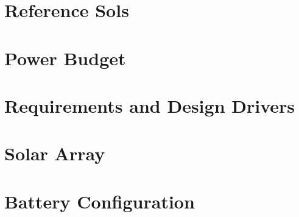 \documentclass[%
    draft, %
    11pt,
    a4paper
]
{memoir}
\begin{document}
\chapter{Reference Sols}
\label{sec:ReferenceSols}


\chapter{Power Budget}
\label{sec:PowerBudget}


\chapter{Requirements and Design Drivers}
\label{sec:RequirementsAndDesignDrivers}



\chapter{Solar Array}
\label{sec:SolarArrayDesign}


\chapter{Battery Configuration}
\label{sec:BatteryConfiguration}


\end{document}
